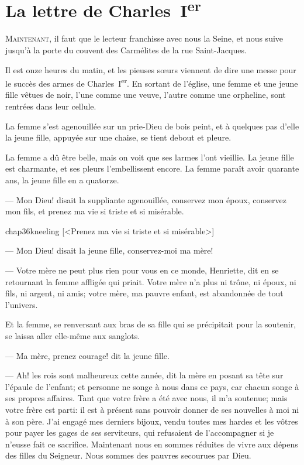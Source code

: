 \chapter{La lettre de Charles~I\textsuperscript{er}}

\lettrine{M}{aintenant,} il faut que le lecteur franchisse avec nous la Seine, et nous suive jusqu'à la porte du couvent des Carmélites de la rue Saint-Jacques.

\zz
Il est onze heures du matin, et les pieuses sœurs viennent de dire une messe pour le succès des armes de Charles~I\textsuperscript{er}. En sortant de l'église, une femme et une jeune fille vêtues de noir, l'une comme une veuve, l'autre comme une orpheline, sont rentrées dans leur cellule.

La femme s'est agenouillée sur un prie-Dieu de bois peint, et à quelques pas d'elle la jeune fille, appuyée sur une chaise, se tient debout et pleure.

La femme a dû être belle, mais on voit que ses larmes l'ont vieillie. La jeune fille est charmante, et ses pleurs l'embellissent encore. La femme paraît avoir quarante ans, la jeune fille en a quatorze.

— Mon Dieu! disait la suppliante agenouillée, conservez mon époux, conservez mon fils, et prenez ma vie si triste et si misérable.

\begin{bwbigpic}
	[\basicscale] 
	{chap36kneeling}
	[<Prenez ma vie si triste et si misérable>]
\end{bwbigpic}

— Mon Dieu! disait la jeune fille, conservez-moi ma mère!

— Votre mère ne peut plus rien pour vous en ce monde, Henriette, dit en se retournant la femme affligée qui priait. Votre mère n'a plus ni trône, ni époux, ni fils, ni argent, ni amis; votre mère, ma pauvre enfant, est abandonnée de tout l'univers.

Et la femme, se renversant aux bras de sa fille qui se précipitait pour la soutenir, se laissa aller elle-même aux sanglots.

— Ma mère, prenez courage! dit la jeune fille.

— Ah! les rois sont malheureux cette année, dit la mère en posant sa tête sur l'épaule de l'enfant; et personne ne songe à nous dans ce pays, car chacun songe à ses propres affaires. Tant que votre frère a été avec nous, il m'a soutenue; mais votre frère est parti: il est à présent sans pouvoir donner de ses nouvelles à moi ni à son père. J'ai engagé mes derniers bijoux, vendu toutes mes hardes et les vôtres pour payer les gages de ses serviteurs, qui refusaient de l'accompagner si je n'eusse fait ce sacrifice. Maintenant nous en sommes réduites de vivre aux dépens des filles du Seigneur. Nous sommes des pauvres secourues par Dieu.

